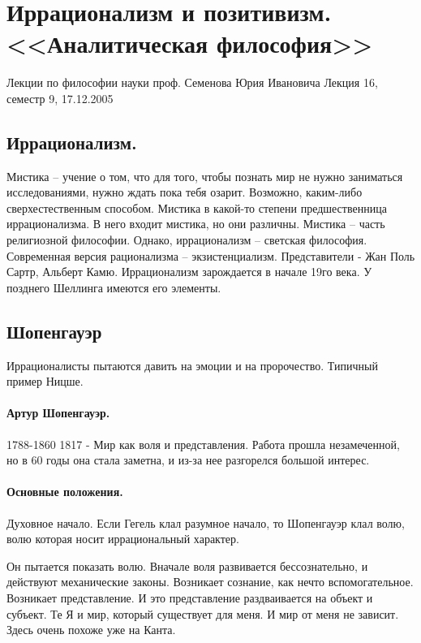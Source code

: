 

\section{Иррационализм и позитивизм. <<Аналитическая философия>>}
Лекции по философии науки проф. Семенова Юрия Ивановича
Лекция 16, семестр 9, 17.12.2005
\subsection{Иррационализм.}

Мистика – учение о том, что для того, чтобы познать мир не нужно заниматься исследованиями, нужно ждать пока тебя озарит. Возможно, каким-либо сверхестественным способом. Мистика в какой-то степени предшественница иррационализма. В него входит мистика, но они различны. Мистика – часть религиозной философии. Однако, иррационализм – светская философия. Современная версия рационализма – экзистенциализм. Представители - Жан Поль Сартр, Альберт Камю. Иррационализм зарождается в начале 19го века. У позднего Шеллинга имеются его элементы.

\subsection{Шопенгауэр}

Иррационалисты пытаются давить на эмоции и на пророчество. Типичный пример Ницше.

\paragraph{Артур Шопенгауэр.} 1788-1860 1817 - Мир как воля и представления. Работа прошла незамеченной, но в 60 годы она стала заметна, и из-за нее разгорелся большой интерес.
\paragraph{Основные положения.}

Духовное начало. Если Гегель клал разумное начало, то Шопенгауэр клал волю, волю которая носит иррациональный характер.

Он пытается показать волю. Вначале воля развивается бессознательно, и действуют механические законы. Возникает сознание, как нечто вспомогательное. Возникает представление. И это представление раздваивается на объект и субъект. Те Я и мир, который существует для меня. И мир от меня не зависит. Здесь очень похоже уже на Канта.

